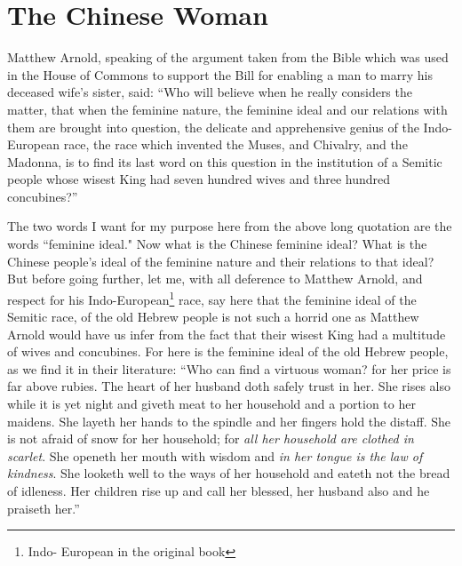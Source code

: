 \chapter{The Chinese Woman}
Matthew Arnold, speaking of the argument taken from the Bible which was used in the House of Commons to support the Bill for enabling a man to marry his deceased wife's sister, said: ``Who will believe when he really considers the matter, that when the feminine nature, the feminine ideal and our relations with them are brought into question, the delicate and apprehensive genius of the Indo-European race, the race which invented the Muses, and Chivalry, and the Madonna, is to find its last word on this question in the institution of a Semitic people whose wisest King had seven hundred wives and three hundred concubines?''

The two words I want for my purpose here from the above long quotation are the words ``feminine ideal." 
Now what is the Chinese feminine ideal?
What is the Chinese people's ideal of the feminine nature and their relations to that ideal?
But before going further, let me, with all deference to Matthew Arnold, and respect for his Indo-European\footnote{Indo- European in the original book} race, say here that the feminine ideal of the Semitic race, of the old Hebrew people is not such a horrid one as Matthew Arnold would have us infer from the fact that their wisest King had a multitude of wives and concubines.
For here is the feminine ideal of the old Hebrew people, as we find it in their literature: ``Who can find a virtuous woman? for her price is far above rubies.
The heart of her husband doth safely trust in her.
She rises also while it is yet night and giveth meat to her household and a portion to her maidens.
She layeth her hands to the spindle and her fingers hold the distaff.
She is not afraid of snow for her household; for \emph{all her household are clothed in scarlet}.
She openeth her mouth with wisdom and \emph{in her tongue is the law of kindness}.
She looketh well to the ways of her household and eateth not the bread of idleness.
Her children rise up and call her blessed, her husband also and he praiseth her.''

